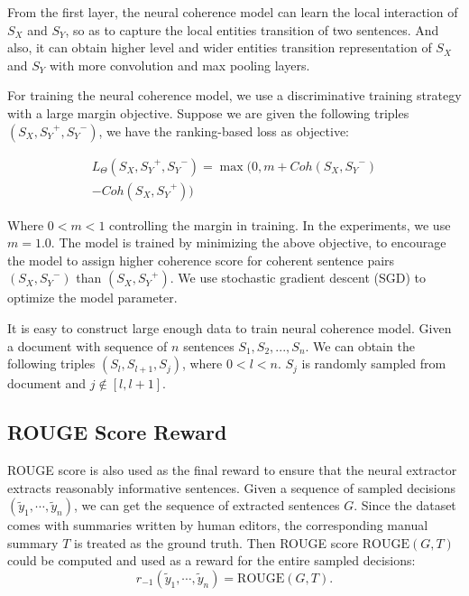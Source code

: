 \documentclass[letterpaper]{article} %
\begin{document}
	
	From the first layer, the neural coherence model can learn the local interaction of $S_X$ and $S_Y$, so as to capture the local entities transition of two sentences.  And also, it can obtain higher level and wider entities transition representation of $S_X$ and $S_Y$ with more convolution and max pooling layers.
	
	
	
	For training the neural coherence model, we use a discriminative training strategy with a large margin objective. 
	Suppose we are given the following triples $(S_X, {S_Y}^{+},{S_Y}^{-})$, we have the ranking-based loss as objective:
	
	\begin{equation}
	\begin{split}
	L_\Theta({S_X}, {S_Y}^+, {S_Y}^-) = 
	\max(0, m+Coh({S_X, {S_Y}^-})\\
	-Coh({S_X}, {S_Y}^+))
	\end{split}
	\label{equation-objective}
	\end{equation}
	
	\noindent Where $0< m <1$ controlling the margin in training. In the experiments, we use $m = 1.0$. The model is trained by minimizing the above objective, to encourage the model to assign higher coherence score for coherent sentence pairs $(S_X, {S_Y}^-)$ than $({S_X}, {S_Y}^+)$. We use stochastic gradient descent (SGD) to optimize the model parameter.
	
	It is easy to construct large enough data to train neural coherence model. Given a document with sequence of $n$ sentences $S_1, S_2,...,S_n$. We can obtain the following triples $(S_l, S_{l+1}, S_j)$, where $0<l<n$. $S_j$ is randomly sampled from document and $j\notin[l,l+1]$.
	
	
	
	\subsection{ROUGE Score Reward}
	ROUGE score is also used as the final reward to ensure that the neural extractor extracts reasonably informative sentences. Given a sequence of sampled decisions $(\tilde{y}_1, \cdots, \tilde{y}_n)$, we can get the sequence of extracted sentences $G$. Since the dataset comes with summaries written by human editors, the corresponding manual summary $T$ is treated as the ground truth. Then ROUGE score $\text{ROUGE}(G, T)$ could be computed and used as a reward for the entire sampled decisions:
	\[ r_{-1}(\tilde{y}_1, \cdots, \tilde{y}_n) = \text{ROUGE}(G, T). \]
	
\end{document}
